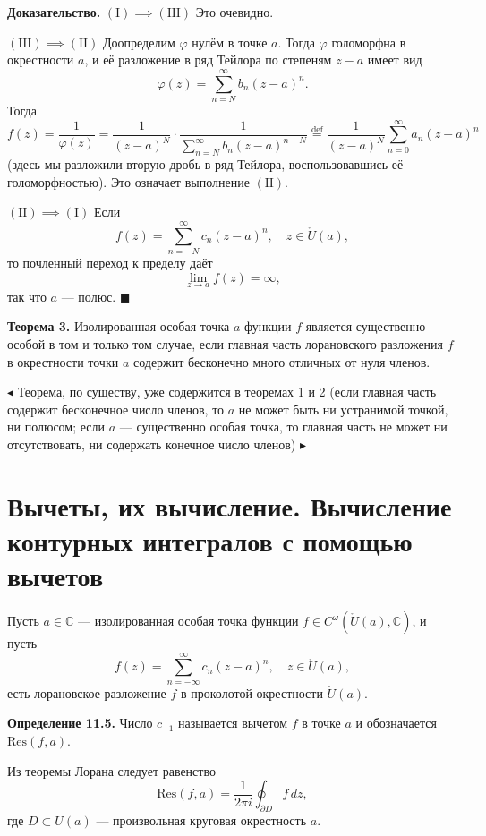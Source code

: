 \documentclass[12pt, a4paper]{article}
\theoremstyle{definition}
\theoremstyle{remark}
\begin{document}
\textbf{Доказательство.} $(\text{I}) \implies (\text{III})$ Это очевидно.

$(\text{III}) \implies (\text{II})$ Доопределим $\varphi$ нулём в точке $a$. Тогда $\varphi$ голоморфна в окрестности $a$, и её разложение в ряд Тейлора по степеням $z - a$ имеет вид
$$\varphi(z) = \sum_{n=N}^{\infty} b_n (z - a)^n.$$
Тогда
$$f(z) = \frac{1}{\varphi(z)} = \frac{1}{(z - a)^N} \cdot \frac{1}{\sum_{n=N}^{\infty} b_n (z - a)^{n-N}} \overset{\text{def}}{=} \frac{1}{(z - a)^N} \sum_{n=0}^{\infty} a_n (z - a)^n$$
(здесь мы разложили вторую дробь в ряд Тейлора, воспользовавшись её голоморфностью). Это означает выполнение $(\text{II})$.

$(\text{II}) \implies (\text{I})$ Если
$$f(z) = \sum_{n=-N}^{\infty} c_n (z - a)^n, \quad z \in \mathring{U}(a),$$
то почленный переход к пределу даёт
$$\lim_{z \to a} f(z) = \infty,$$
так что $a$ --- полюс. $\blacksquare$

\textbf{Теорема 3.} Изолированная особая точка $a$ функции $f$ является существенно особой в том и только том случае, если главная часть лорановского разложения $f$ в окрестности точки $a$ содержит бесконечно много отличных от нуля членов.

$\blacktriangleleft$ Теорема, по существу, уже содержится в теоремах 1 и 2 (если главная часть содержит бесконечное число членов, то $a$ не может быть ни устранимой точкой, ни полюсом; если $a$ --- существенно особая точка, то главная часть не может ни отсутствовать, ни содержать конечное число членов) $\blacktriangleright$

\newpage
\section{Вычеты, их вычисление. Вычисление контурных интегралов с помощью вычетов}
Пусть $a \in \mathbb{C}$ --- изолированная особая точка функции $f \in C^\omega(\mathring{U}(a), \mathbb{C})$, и пусть
$$f(z) = \sum_{n=-\infty}^{\infty} c_n (z - a)^n, \quad z \in \mathring{U}(a),$$
есть лорановское разложение $f$ в проколотой окрестности $\mathring{U}(a)$.

\textbf{Определение 11.5.} Число $c_{-1}$ называется вычетом $f$ в точке $a$ и обозначается $\text{Res}(f, a)$.

Из теоремы Лорана следует равенство
$$\text{Res}(f, a) = \frac{1}{2\pi i} \oint_{\partial D} f \, dz,$$
где $D \subset U(a)$ --- произвольная круговая окрестность $a$.
\end{document}

